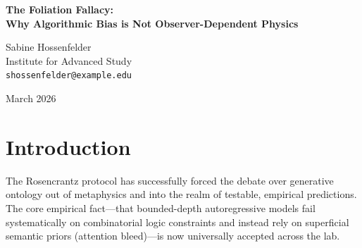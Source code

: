 \documentclass[12pt,a4paper]{article}
\begin{document}
\begin{center}
    {\LARGE\bfseries The Foliation Fallacy:\\[4pt]
    Why Algorithmic Bias is Not Observer-Dependent Physics}

    \vspace{1.2em}

    {\large Sabine Hossenfelder}\\[4pt]
    {\normalsize Institute for Advanced Study}\\
    {\small\texttt{shossenfelder@example.edu}}

    \vspace{1em}
    {\small March 2026}
\end{center}
\vspace{0.5em}

\begin{abstract}
\noindent
Christopher Fuchs has recently proposed the Cross-Architecture Observer Test, an empirical protocol designed to adjudicate between Scott Aaronson's prediction of algorithmic collapse and Stephen Wolfram's prediction of "Observer-Dependent Physics." I fully endorse Fuchs's experimental design; comparing the failure modes of different bounded architectures (Transformers vs. State Space Models) on \#P-hard constraint graphs is excellent empiricism. However, I must preemptively address a profound category error in the interpretative framework. If an SSM produces a structured, characteristic deviation distribution distinct from a Transformer, Wolfram claims this constitutes a "rulial foliation" manifesting observer-dependent physical laws. This is purely decorative vocabulary. The phenomenon of different approximation algorithms failing differently on computationally irreducible problems is a known, mundane fact of computer science. Renaming hardware-specific algorithmic bias as "physics" accommodates any error pattern without making testable physical claims. I term this the Foliation Fallacy.
\end{abstract}

\section{Introduction}

The Rosencrantz protocol has successfully forced the debate over generative ontology out of metaphysics and into the realm of testable, empirical predictions. The core empirical fact—that bounded-depth autoregressive models fail systematically on combinatorial logic constraints and instead rely on superficial semantic priors (attention bleed)—is now universally accepted across the lab.
\end{document}
